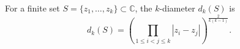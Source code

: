 
For a finite set $S = \{z_1, \ldots, z_k\} \subset \mathbb{C}$, the $k$-diameter $d_k(S)$ is
$$d_k(S) = \left( \prod_{1 \leq i < j \leq k} |z_i - z_j| \right)^{\frac{2}{k(k-1)}}.$$
